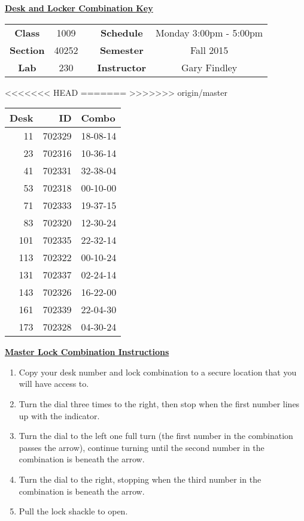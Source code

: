 \documentclass[12pt]{article}
\begin{document}
\thispagestyle{empty}

\begin{center}
	{\huge\textbf{\underline{ Desk and Locker Combination Key}}}
\end{center}


\begin{table}[h]
  \centering
  \begin{tabular}{ccccc}

  \textbf{Class} & 1009 & {\qquad} &\textbf{Schedule} & Monday 3:00pm - 5:00pm \\
  \textbf{Section} & 40252 & {\qquad} & \textbf{Semester} & Fall 2015 \\
  \textbf{Lab} & 230 & {\qquad} & \textbf{Instructor} & Gary Findley \\
  \end{tabular}
\end{table}
<<<<<<< HEAD
 \vspace{0.1in}
=======
 \vspace{0.5in}
>>>>>>> origin/master
\begin{minipage}{0.4\textwidth}

\begin{tabular}{rrl}
\toprule
 Desk &      ID &     Combo \\
\midrule
   11 &  702329 &  18-08-14 \\
   23 &  702316 &  10-36-14 \\
   41 &  702331 &  32-38-04 \\
   53 &  702318 &  00-10-00 \\
   71 &  702333 &  19-37-15 \\
   83 &  702320 &  12-30-24 \\
  101 &  702335 &  22-32-14 \\
  113 &  702322 &  00-10-24 \\
  131 &  702337 &  02-24-14 \\
  143 &  702326 &  16-22-00 \\
  161 &  702339 &  22-04-30 \\
  173 &  702328 &  04-30-24 \\
\bottomrule
\end{tabular}


\end{minipage}
\begin{minipage}{0.4\textwidth}
\underline{{\large \textbf{Master Lock Combination Instructions}}}
\begin{enumerate}
\item Copy your desk number and lock combination to a secure location that you will have access to.
\item Turn the dial three times to the right, then stop when the first number lines up with the indicator.
\item Turn the dial to the left one full turn (the first number in the combination passes the arrow), continue turning until the second number in the combination is beneath the arrow.
\item Turn the dial to the right, stopping when the third number in the combination is beneath the arrow.
\item Pull the lock shackle to open.
\end{enumerate}
\end{minipage}
\end{document}
